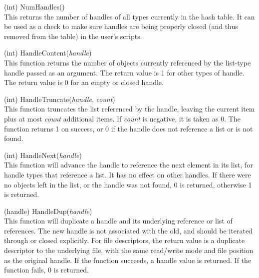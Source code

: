 \begin{description}
\item{(int) \vt NumHandles()}\\
This returns the number of handles of all types currently in the hash
table.  It can be used as a check to make sure handles are being
properly closed (and thus removed from the table) in the user's
scripts.

\item{(int) \vt HandleContent({\it handle\/})}\\
This function returns the number of objects currently referenced by
the list-type handle passed as an argument.  The return value is 1 for
other types of handle.  The return value is 0 for an empty or closed
handle.

\item{(int) \vt HandleTruncate({\it handle\/}, {\it count\/})}\\
This function truncates the list referenced by the handle, leaving the
current item plus at most {\it count} additional items.  If {\it
count} is negative, it is taken as 0.  The function returns 1 on
success, or 0 if the handle does not reference a list or is not found.

\item{(int) \vt HandleNext({\it handle\/})}\\
This function will advance the handle to reference the next element in
its list, for handle types that reference a list.  It has no effect on
other handles.  If there were no objects left in the list, or the
handle was not found, 0 is returned, otherwise 1 is returned.

\item{(handle) \vt HandleDup({\it handle\/})}\\
This function will duplicate a handle and its underlying reference or
list of references.  The new handle is not associated with the old,
and should be iterated through or closed explicitly.  For file
descriptors, the return value is a duplicate descriptor to the
underlying file, with the same read/write mode and file position as
the original handle.  If the function succeeds, a handle value is
returned.  If the function fails, 0 is returned.


\end{description}
